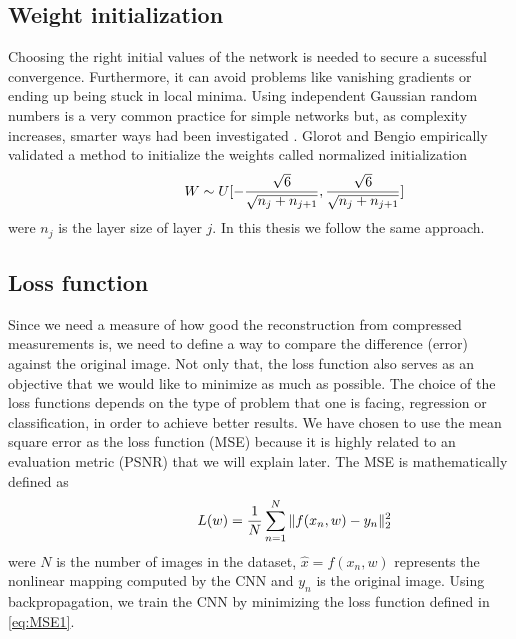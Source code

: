 \FloatBarrier

\subsection{Weight initialization}
Choosing the right initial values of the network is needed to secure a sucessful convergence. Furthermore, it can avoid problems like vanishing gradients or ending up being stuck in local minima. Using independent Gaussian random numbers is a very common practice for simple networks but, as complexity increases, smarter ways had been investigated \cite{glorot2010understanding}. Glorot and Bengio empirically validated a method to initialize the weights called normalized initialization 
\begin{equation} \label{eq:Initw1}
\centering
\hspace{3em} \hspace{3em} \hspace{3em} W \sim U [ - \frac{\sqrt{6}}{\sqrt{n_j + n_{j+1}}}, \frac{\sqrt{6}}{\sqrt{n_j + n_{j+1}}} ] \enspace \enspace \hspace{3em}
\end{equation}  
were $n_j$ is the layer size of layer $j$. In this thesis we follow the same approach.   

\FloatBarrier

\subsection{Loss function}
Since we need a measure of how good the reconstruction from compressed measurements is, we need to define a way to compare the difference (error) against the original image. Not only that, the loss function also serves as an objective that we would like to minimize as much as possible. The choice of the loss functions depends on the type of problem that one is facing, regression or classification, in order to achieve better results. We have chosen to use the mean square error as the loss function (MSE) because it is highly related to an evaluation metric (PSNR) that we will explain later. The MSE is mathematically defined as 
\begin{equation} \label{eq:MSE1}
\centering
\hspace{3em} \hspace{3em} \hspace{3em} L (w) = \frac{1}{N} \sum\limits_{n=1}^N \Vert f(x_n,w) - y_n\Vert_{2}^2 \enspace \enspace \hspace{3em}
\end{equation} 
were $N$ is the number of images in the dataset, $\hat{x} = f(x_n,w)$ represents the nonlinear mapping computed by the CNN and $y_n$ is the original image. Using backpropagation, we train the CNN by minimizing the loss function defined in \ref{eq:MSE1}.  

